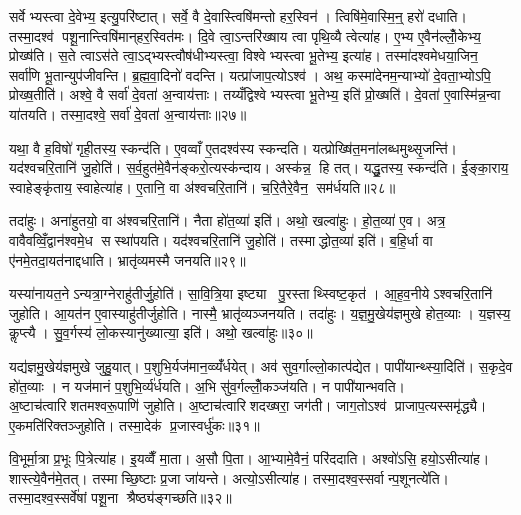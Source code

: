 सर्वेभ्यस्त्वा दे॒वेभ्य॒ इत्यु॒परि॑ष्टात्। सर्वे॒ वै दे॒वास्त्विषि॑मन्तो हर॒स्विन॑। त्विषि॑मे॒वास्मि॒न्॒ हरो॑ दधाति। तस्मा॒दश्व॑ पशू॒नान्त्विषि॑मान्‌हर॒स्वित॑मः। दि॒वे त्वा॒ऽन्तरि॑ख्षाय त्वा पृथि॒व्यै त्वेत्या॑ह। ए॒भ्य ए॒वैन॑ल्लोँ॒केभ्य॒ प्रोख्ष॑ति। स॒ते त्वाऽस॑ते त्वा॒ऽद्भ्यस्त्वौष॑धीभ्यस्त्वा॒ विश्वेभ्यस्त्वा भू॒तेभ्य॒ इत्या॑ह। तस्मा॑दश्वमेधया॒जिन॒ सर्वा॑णि भू॒तान्युप॑जीवन्ति। ब्र॒ह्म॒वा॒दिनो॑ वदन्ति। यत्प्रा॑जाप॒त्योऽश्व॑। अथ॒ कस्मा॑देनम॒न्याभ्यो॑ दे॒वता॒भ्योऽपि॒ प्रोख्ष॒तीति॑। अश्वे॒ वै सर्वा॑ दे॒वता॑ अ॒न्वाय॑त्ताः। तय्यँद्विश्वेभ्यस्त्वा भू॒तेभ्य॒ इति॑ प्रो॒ख्षति॑। दे॒वता॑ ए॒वास्मि॑न्न॒न्वा या॑तयति। तस्मा॒दश्वे॒ सर्वा॑ दे॒वता॑ अ॒न्वाय॑त्ताः॥२७॥\anuvakamend[सा॒र॒सा॒रित॒मोऽप॑चिततमः प्राजाप॒त्योऽश्व॒ पञ्च॑ च]

यथा॒ वै ह॒विषो॑ गृही॒तस्य॒ स्कन्द॑ति। ए॒वव्वाँ ए॒तदश्व॑स्य स्कन्दति। यत्प्रोख्षि॑त॒मना॑लब्धमुथ्सृ॒जन्ति॑। यद॑श्वचरि॒तानि॑ जु॒होति॑। स॒र्व॒हुत॑मे॒वैन॑ङ्करो॒त्यस्क॑न्दाय। अस्क॑न्न॒ हि तत्। यद्धु॒तस्य॒ स्कन्द॑ति। ई॒ङ्का॒राय॒ स्वाहेङ्कृ॑ताय॒ स्वाहेत्या॑ह। ए॒तानि॒ वा अ॑श्वचरि॒तानि॑। च॒रि॒तैरे॒वैन॒ सम॑र्धयति॥२८॥

तदा॑हुः। अना॑हुतयो॒ वा अ॑श्वचरि॒तानि॑। नैता हो॑त॒व्या॑ इति॑। अथो॒ खल्वा॑हुः। हो॒त॒व्या॑ ए॒व। अत्र॒ वावैवव्विँ॒द्वान॑श्वमे॒ध सस्था॑पयति। यद॑श्वचरि॒तानि॑ जु॒होति॑। तस्माद्धोत॒व्या॑ इति॑। ब॒हि॒र्धा वा ए॑नमे॒तदा॒यत॑नाद्दधाति। भ्रातृ॑व्यमस्मै जनयति॥२९॥

यस्या॑नायत॒नेऽन्यत्रा॒ग्नेराहु॑तीर्जु॒होति॑। सा॒वि॒त्रि॒या इष्ट्या पु॒रस्ताथ्स्विष्ट॒कृत॑। आ॒ह॒व॒नीयेऽश्वचरि॒तानि॑ जुहोति। आ॒यत॑न ए॒वास्याहु॑तीर्जुहोति। नास्मै॒ भ्रातृ॑व्यञ्जनयति। तदा॑हुः। य॒ज्ञ॒मु॒खेय॑ज्ञमुखे होत॒व्याः। य॒ज्ञस्य॒ कॢप्त्यै। सु॒व॒र्गस्य॑ लो॒कस्यानु॑ख्यात्या॒ इति॑। अथो॒ खल्वा॑हुः॥३०॥

यद्य॑ज्ञमु॒खेय॑ज्ञमुखे जुहु॒यात्। प॒शुभि॒र्यज॑मान॒व्व्यँ॑र्धयेत्। अव॑ सुव॒र्गाल्लो॒कात्प॑द्येत। पापी॑यान्थ्स्या॒दिति॑। स॒कृदे॒व हो॑त॒व्याः। न यज॑मानं प॒शुभि॒र्व्य॑र्धयति। अ॒भि सु॑व॒र्गल्लोँ॒कञ्ज॑यति। न पापी॑यान्भवति। अ॒ष्टाच॑त्वारिशतमश्वरू॒पाणि॑ जुहोति। अ॒ष्टाच॑त्वारिशदख्षरा॒ जग॑ती। जाग॒तोऽश्व॑ प्राजाप॒त्यस्समृ॑द्ध्यै। ए॒कमति॑रिक्तञ्जुहोति। तस्मा॒देक॑ प्र॒जास्वर्धु॑कः॥३१॥\anuvakamend[अ॒र्ध॒य॒ति॒ ज॒न॒य॒ति॒ खल्वा॑हु॒र्जग॑ती॒ त्रीणि॑ च]

वि॒भूर्मा॒त्रा प्र॒भूः पि॒त्रेत्या॑ह। इ॒यव्वैँ मा॒ता। अ॒सौ पि॒ता। आ॒भ्यामे॒वैनं॒ परि॑ददाति। अश्वो॑ऽसि॒ हयो॒ऽसीत्या॑ह। शास्त्ये॒वैन॑मे॒तत्। तस्माच्छि॒ष्टाः प्र॒जा जा॑यन्ते। अत्यो॒ऽसीत्या॑ह। तस्मा॒दश्व॒स्सर्वान्प॒शूनत्ये॑ति। तस्मा॒दश्व॒स्सर्वे॑षां पशू॒ना श्रैष्ठ्य॑ङ्गच्छति॥३२॥

